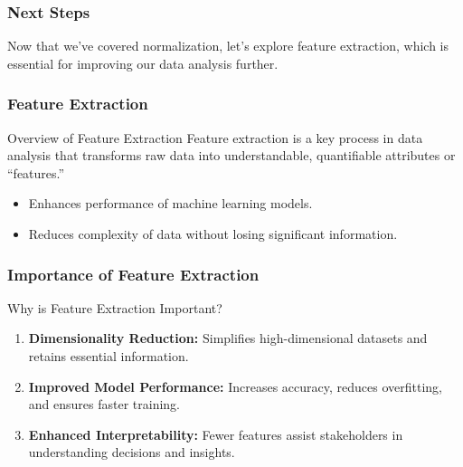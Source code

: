 \documentclass[aspectratio=169]{beamer}
\begin{document}
\begin{frame}[fragile]
    \frametitle{Next Steps}
    Now that we've covered normalization, let’s explore feature extraction, which is essential for improving our data analysis further.
\end{frame}

\begin{frame}[fragile]
    \frametitle{Feature Extraction}
    \begin{block}{Overview of Feature Extraction}
        Feature extraction is a key process in data analysis that transforms raw data into understandable, quantifiable attributes or “features.” 
    \end{block}
    \begin{itemize}
        \item Enhances performance of machine learning models.
        \item Reduces complexity of data without losing significant information.
    \end{itemize}
\end{frame}

\begin{frame}[fragile]
    \frametitle{Importance of Feature Extraction}
    \begin{block}{Why is Feature Extraction Important?}
        \begin{enumerate}
            \item \textbf{Dimensionality Reduction:} 
            Simplifies high-dimensional datasets and retains essential information.
            \item \textbf{Improved Model Performance:} 
            Increases accuracy, reduces overfitting, and ensures faster training.
            \item \textbf{Enhanced Interpretability:} 
            Fewer features assist stakeholders in understanding decisions and insights.
        \end{enumerate}
    \end{block}
\end{frame}
\end{document}
